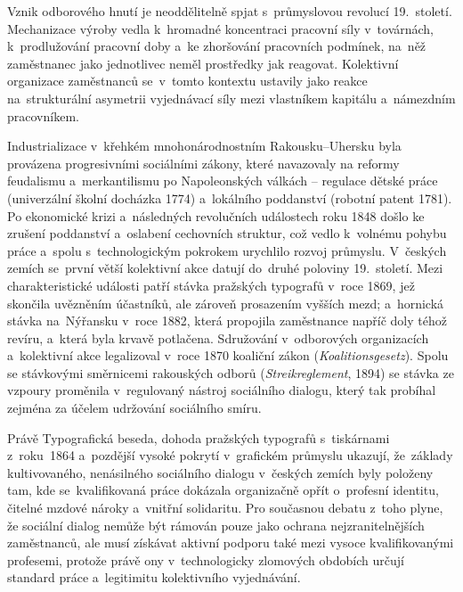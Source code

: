 
Vznik odborového hnutí je neoddělitelně spjat s~průmyslovou revolucí 19.~století.
Mechanizace výroby vedla k~hromadné koncentraci pracovní síly v~továrnách, k~prodlužování pracovní doby a~ke zhoršování pracovních podmínek, na~něž zaměstnanec jako jednotlivec neměl prostředky jak reagovat.
Kolektivní organizace zaměstnanců se~v~tomto kontextu ustavily jako reakce na~strukturální asymetrii vyjednávací síly mezi vlastníkem kapitálu a~námezdním pracovníkem.\par
Industrializace v~křehkém mnohonárodnostním Rakousku--Uhersku byla provázena progresivními sociálními zákony, které navazovaly na reformy feudalismu a~merkantilismu po Napoleonských válkách -- regulace dětské práce (univerzální školní docházka 1774) a~lokálního poddanství (robotní patent 1781). Po ekonomické krizi a~následných revolučních událostech roku 1848 došlo ke zrušení poddanství a~oslabení cechovních struktur, což vedlo k~volnému pohybu práce a~spolu s~technologickým pokrokem urychlilo rozvoj průmyslu.
V~českých zemích se~první větší kolektivní akce datují do~druhé poloviny 19.~století. Mezi charakteristické události patří stávka pražských typografů v~roce 1869, jež skončila uvězněním účastníků, ale zároveň prosazením vyšších mezd; a~hornická stávka na~Nýřansku v~roce 1882, která propojila zaměstnance napříč doly téhož revíru, a~která byla krvavě potlačena. Sdružování v~odborových organizacích a~kolektivní akce legalizoval v~roce 1870 koaliční zákon (\emph{Koalitionsgesetz}). Spolu se stávkovými směrnicemi rakouských odborů (\emph{Streikreglement}, 1894) se stávka ze vzpoury proměnila v~regulovaný nástroj sociálního dialogu, který tak probíhal zejména za účelem udržování sociálního smíru.~\cite{Pokorny_HistorieOdbory2020}\par
Právě Typografická beseda, dohoda pražských typografů s~tiskárnami z~roku~1864 a~pozdější vysoké pokrytí  v~grafickém průmyslu ukazují, že~základy kultivovaného, nenásilného sociálního dialogu v~českých zemích byly položeny tam, kde se~kvalifikovaná práce dokázala organizačně opřít o~profesní identitu, čitelné mzdové nároky a~vnitřní solidaritu. Pro současnou debatu z~toho plyne, že sociální dialog nemůže být rámován pouze jako ochrana nejzranitelnějších zaměstnanců, ale musí získávat aktivní podporu také mezi vysoce kvalifikovanými profesemi, protože právě ony v~technologicky zlomových obdobích určují standard práce a~legitimitu kolektivního vyjednávání.\par

